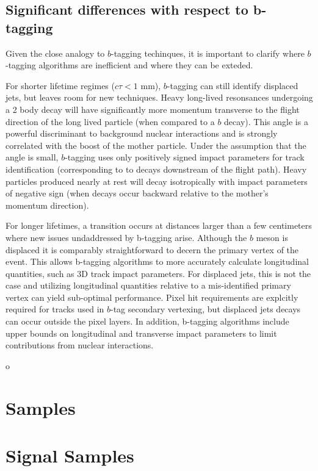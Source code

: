 \subsection{Significant differences with respect to b-tagging}

Given the close analogy to $b$-tagging techinques, it is important to clarify where $b$-tagging algorithms are inefficient and where they can be exteded.

For shorter lifetime regimes ($c\tau < 1$ mm), $b$-tagging  can still identify displaced jets, but leaves room for new techniques. 
Heavy long-lived resonsances undergoing a 2 body decay will have significantly more momentum transverse to the flight direction of the long lived particle (when compared to a $b$ decay). This angle is a powerful discriminant to background nuclear interactions and is strongly correlated with the boost of the mother particle. 
Under the assumption that the angle is small, $b$-tagging uses only positively signed impact parameters for track identification (corresponding to to decays downstream of the flight path). Heavy particles produced 
nearly at rest will decay isotropically with impact parameters of negative sign (when decays occur backward relative to the mother's momentum direction). 

For longer lifetimes, a transition occurs at distances larger than a few centimeters where new issues undaddressed by b-tagging arise. Although the $b$ meson is displaced
it is comparably straightforward to decern the primary vertex of the event. This allows b-tagging algorithms to more accurately calculate longitudinal quantities, such as 3D track impact parameters. 
For displaced jets, this is not the case  and utilizing longitudinal quantities 
relative to a mis-identified primary vertex can yield sub-optimal performance. 
Pixel hit requirements are explcitly required for tracks used in $b$-tag secondary vertexing,
 but displaced jets decays can occur outside the pixel layers. In addition, b-tagging algorithms include upper bounds on
 longitudinal and transverse impact parameters to limit contributions from nuclear interactions. 


o
\section{Samples}

\section{Signal Samples}

